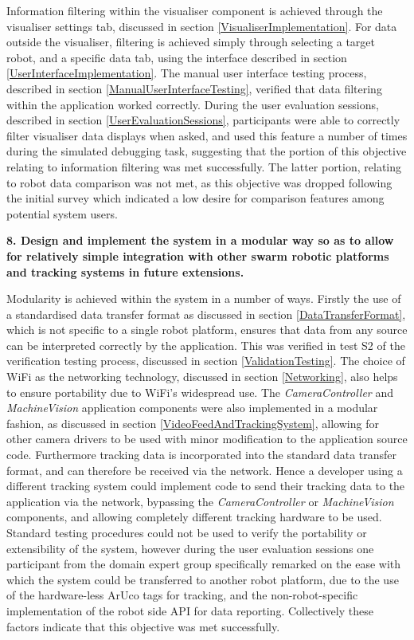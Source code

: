 Information filtering within the visualiser component is achieved through the visualiser settings tab, discussed in section \ref{VisualiserImplementation}. For data outside the visualiser, filtering is achieved simply through selecting a target robot, and a specific data tab, using the interface described in section \ref{UserInterfaceImplementation}. The manual user interface testing process, described in section \ref{ManualUserInterfaceTesting}, verified that data filtering within the application worked correctly. During the user evaluation sessions, described in section \ref{UserEvaluationSessions}, participants were able to correctly filter visualiser data displays when asked, and used this feature a number of times during the simulated debugging task, suggesting that the portion of this objective relating to information filtering was met successfully. The latter portion, relating to robot data comparison was not met, as this objective was dropped following the initial survey which indicated a low desire for comparison features among potential system users.

\noindent \textbf{8. Design and implement the system in a modular way so as to allow for relatively simple integration with other swarm robotic platforms and tracking systems in future extensions.}

Modularity is achieved within the system in a number of ways. Firstly the use of a standardised data transfer format as discussed in section \ref{DataTransferFormat}, which is not specific to a single robot platform, ensures that data from any source can be interpreted correctly by the application. This was verified in test S2 of the verification testing process, discussed in section \ref{ValidationTesting}. The choice of WiFi as the networking technology, discussed in section \ref{Networking}, also helps to ensure portability due to WiFi's widespread use. The \textit{CameraController} and \textit{MachineVision} application components were also implemented in a modular fashion, as discussed in section \ref{VideoFeedAndTrackingSystem}, allowing for other camera drivers to be used with minor modification to the application source code. Furthermore tracking data is incorporated into the standard data transfer format, and can therefore be received via the network. Hence a developer using a different tracking system could implement code to send their tracking data to the application via the network, bypassing the \textit{CameraController} or \textit{MachineVision} components, and allowing completely different tracking hardware to be used. Standard testing procedures could not be used to verify the portability or extensibility of the system, however during the user evaluation sessions one participant from the domain expert group specifically remarked on the ease with which the system could be transferred to another robot platform, due to the use of the hardware-less ArUco tags for tracking, and the non-robot-specific implementation of the robot side API for data reporting. Collectively these factors indicate that this objective was met successfully.

